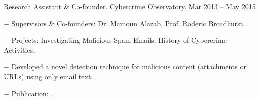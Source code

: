 \documentclass[10pt]{article}
\newcommand{\halfblankline}{\quad\vspace{-0.5\baselineskip}\pagebreak[3]}
\begin{document}
\begin{innerlist}


	\item Research Assistant \& Co-founder. Cybercrime Observatory. \hfill {Mar 2013 -- May 2015}
	\begin{innerlist}
		\item[$-$] Supervisors \& Co-founders: Dr. Mamoun Alazab, Prof. Roderic Broadhurst.
		\item[$-$] Projects: Investigating Malicious Spam Emails, History of Cybercrime Activities.
		\item[$-$] Developed a novel detection technique for malicious content (attachments or URLs) using only email text.
		\item[$-$] Publication: \cite{Tran2013c}.
	\end{innerlist}


\end{innerlist}
\end{document}
